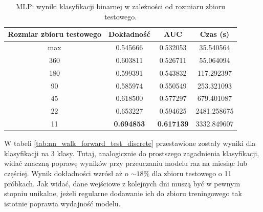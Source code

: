 \documentclass[a4paper, twoside, 11pt, openright]{article}
\begin{document}
\begin{table}[H]
    \centering
    \begin{tabular}{|c|c|c|c|}
    \hline
        \textbf{Rozmiar zbioru testowego} & \textbf{Dokładność} &  \textbf{AUC} &  \textbf{Czas (s)} \\ \hline 
max                           &  0.545666 &  0.532053 &   35.540564 \\  \hline
360                         &  0.603811 &  0.526711 &    55.064094 \\  \hline
180                         &  0.599391 &  0.543832 &   117.292397 \\  \hline
90                         &  0.585974 &  0.550549 &   253.321093 \\  \hline
45                         &  0.618500 &  0.577297 &   679.401087 \\  \hline
22                          &  0.653227 &  0.594625 &  2481.258675 \\  \hline
11                          &  \textbf{0.694853} &  \textbf{0.617139} &  3332.849607 \\ \hline
    \end{tabular}
    \caption{MLP: wyniki klasyfikacji binarnej w zależności od rozmiaru zbioru testowego.}
    \label{tab:nn_walk_forward_test_binary}
\end{table}

W tabeli \ref{tab:nn_walk_forward_test_discrete} przestawione zostały wyniki dla klasyfikacji na 3 klasy. Tutaj, analogicznie do prostszego zagadnienia klasyfikacji, widać znaczną poprawę wyników przy przeuczaniu modelu raz na miesiąc lub częściej. Wynik dokładności wzrósł aż o $\sim 18\%$ dla zbioru testowego o 11 próbkach. Jak widać, dane wejściowe z kolejnych dni muszą być w pewnym stopniu unikalne, jeżeli regularne dodawanie ich do zbioru treningowego tak istotnie poprawia wydajność modelu.
\end{document}

